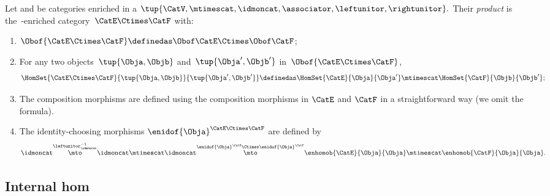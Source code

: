 \begin{ctdefinition}
    \label{def:prod_enriched_cat}
    Let \CatE and \CatF be categories enriched in a  $\tup{\CatV, \mtimescat, \idmoncat, \associator, \leftunitor, \rightunitor}.
    $
    Their \emph{product} is the~\CatV-enriched category~$\CatE\Ctimes \CatF$ with:
    \begin{enumerate}
        \item $\Obof{\CatE\Ctimes \CatF}\definedas \Obof\CatE \Ctimes \Obof\CatF$;
        \item For any two objects~$\tup{\Obja,\Objb}$ and~$\tup{\Obja',\Objb'}$ in~$\Obof{\CatE\Ctimes \CatF}$,
              \begin{equation}
                  \HomSet{\CatE\Ctimes \CatF}{\tup{\Obja,\Objb}}{\tup{\Obja',\Objb'}}\definedas \HomSet{\CatE}{\Obja}{\Obja'}\mtimescat \HomSet{\CatF}{\Objb}{\Objb'};
              \end{equation}
        \item The composition morphisms are defined using the composition morphisms in $\CatE$ and $\CatF$ in a straightforward way (we omit the formula).
        \item The identity-choosing morphisms $\enidof{\Obja}^{\CatE \Ctimes \CatF}$ are defined by
              \begin{equation}
                  \idmoncat \overset{\leftunitor^{-1}_\idmoncat}{\mto} \idmoncat \mtimescat \idmoncat \overset{\enidof{\Obja}^{\CatE} \Ctimes \enidof{\Obja}^{\CatF}}{\mto} \enhomob{\CatE}{\Obja}{\Obja} \mtimescat \enhomob{\CatF}{\Obja}{\Obja}.
              \end{equation}
    \end{enumerate}
\end{ctdefinition}


\subsection{Internal hom}

